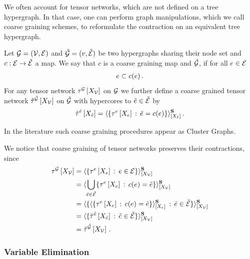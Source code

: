 We often account for tensor networks, which are not defined on a tree hypergraph.
In that case, one can perform graph manipulations, which we call coarse graining schemes, to reformulate the contraction on an equivalent tree hypergraph.

\begin{definition}
    Let $\mathcal{G}=(\mathcal{V},\mathcal{E})$ and $\tilde{\mathcal{G}}=(v,\tilde{\mathcal{E}})$ be two hypergraphs sharing their node set and $c: \mathcal{E} \rightarrow \tilde{\mathcal{E}}$ a map.
    We say that $c$ is a coarse graining map and $\tilde{\mathcal{G}}$, if for all $e\in\mathcal{E}$
    \begin{align*}
        e \subset c(e) \, .
    \end{align*}
    For any tensor network $\tau^{\mathcal{G}}\left[X_{\mathcal{V}}\right]$ on $\mathcal{G}$ we further define a coarse grained tensor network $\tilde{\tau}^{\tilde{\mathcal{G}}}\left[X_{\mathcal{V}}\right]$ on $\tilde{\mathcal{G}}$ with hypercores to $\tilde{e}\in\tilde{\mathcal{E}}$ by
    \begin{align*}
        \tilde{\tau}^{\tilde{e}}\left[X_{\tilde{e}}\right]
        = \langle\{\tau^{e}\left[X_{e}\right]\,:\,\tilde{e}=c(e)\}\rangle^{\mathbf{S}}_{[X_{\tilde{e}}]} \, .
    \end{align*}
\end{definition}

In the literature such coarse graining procedures appear as Cluster Graphs.

We notice that coarse graining of tensor networks preserves their contractions, since
\begin{align*}
    \tau^{\mathcal{G}}\left[X_{\mathcal{V}}\right]
    &= \langle\{\tau^{e}\left[X_{e}\right]\,:\,e\in\mathcal{E}\}\rangle^{\mathbf{S}}_{[X_{\mathcal{V}}]} \\
    &= \langle\bigcup_{\tilde{e}\in\tilde{\mathcal{E}}}\{\tau^{e}\left[X_{e}\right]\,:\, c(e)=\tilde{e}\}\rangle^{\mathbf{S}}_{[X_{\mathcal{V}}]} \\
    &= \langle\{\langle\{\tau^{e}\left[X_{e}\right]\,:\, c(e)=\tilde{e}\}\rangle^{\mathbf{S}}_{[X_{e}]}\,:\,\tilde{e}\in\tilde{\mathcal{E}}\}\rangle^{\mathbf{S}}_{[X_{\mathcal{V}}]} \\
    &= \langle\{\tilde{\tau}^{\tilde{e}}\left[X_{\tilde{e}}\right]\,:\,\tilde{e}\in\tilde{\mathcal{E}}\}\rangle^{\mathbf{S}}_{[X_{\mathcal{V}}]} \\
    &= \tilde{\tau}^{\tilde{\mathcal{G}}}\left[X_{\mathcal{V}}\right] \, .
\end{align*}

\subsubsection{Variable Elimination}

